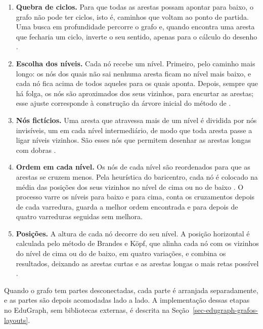 \begin{enumerate}
    \item \textbf{Quebra de ciclos.} Para que todas as arestas possam apontar para baixo, o grafo não pode ter ciclos, isto é, caminhos que voltam ao ponto de partida. Uma busca em profundidade percorre o grafo e, quando encontra uma aresta que fecharia um ciclo, inverte o seu sentido, apenas para o cálculo do desenho \cite{healy2013hierarquico}.
    \item \textbf{Escolha dos níveis.} Cada nó recebe um nível. Primeiro, pelo caminho mais longo: os nós dos quais não sai nenhuma aresta ficam no nível mais baixo, e cada nó fica acima de todos aqueles para os quais aponta. Depois, sempre que há folga, os nós são aproximados dos seus vizinhos, para encurtar as arestas; esse ajuste corresponde à construção da árvore inicial do método de .
    \item \textbf{Nós fictícios.} Uma aresta que atravessa mais de um nível é dividida por nós invisíveis, um em cada nível intermediário, de modo que toda aresta passe a ligar níveis vizinhos. São esses nós que permitem desenhar as arestas longas com dobras \cite{healy2013hierarquico}.
    \item \textbf{Ordem em cada nível.} Os nós de cada nível são reordenados para que as arestas se cruzem menos. Pela heurística do baricentro, cada nó é colocado na média das posições dos seus vizinhos no nível de cima ou no de baixo \cite{healy2013hierarquico}. O processo varre os níveis para baixo e para cima, conta os cruzamentos depois de cada varredura, guarda a melhor ordem encontrada e para depois de quatro varreduras seguidas sem melhora.
    \item \textbf{Posições.} A altura de cada nó decorre do seu nível. A posição horizontal é calculada pelo método de Brandes e Köpf, que alinha cada nó com os vizinhos do nível de cima ou do de baixo, em quatro variações, e combina os resultados, deixando as arestas curtas e as arestas longas o mais retas possível .
\end{enumerate}

Quando o grafo tem partes desconectadas, cada parte é arranjada separadamente, e as partes são depois acomodadas lado a lado. A implementação dessas etapas no EduGraph, sem bibliotecas externas, é descrita na Seção~\ref{sec-edugraph-grafos-layouts}.

